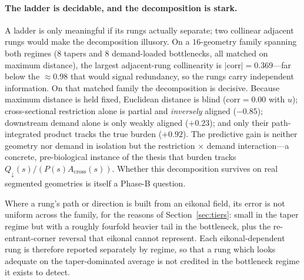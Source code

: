 \documentclass[11pt]{article}
\theoremstyle{remark}
\newcommand{\Acr}{A_{\mathrm{cross}}}
\newcommand{\Qdn}{Q_{\downarrow}}
\begin{document}
\paragraph{The ladder is decidable, and the decomposition is stark.} A ladder is
only meaningful if its rungs actually separate; two collinear adjacent rungs would
make the decomposition illusory. On a $16$-geometry family spanning both regimes
($8$ tapers and $8$ demand-loaded bottlenecks, all matched on maximum distance),
the largest adjacent-rung collinearity is $\lvert\text{corr}\rvert=0.369$---far
below the $\approx0.98$ that would signal redundancy, so the rungs carry
independent information. On that matched family the decomposition is decisive.
Because maximum distance is held fixed, Euclidean distance is blind
($\text{corr}=0.00$ with $u$); cross-sectional restriction alone is partial and
\emph{inversely} aligned ($-0.85$); downstream demand alone is only weakly aligned
($+0.23$); and only their path-integrated product tracks the true burden
($+0.92$). The predictive gain is neither geometry nor demand in isolation but the
restriction$\,\times\,$demand interaction---a concrete, pre-biological instance of
the thesis that burden tracks $\Qdn(s)/(P(s)\Acr(s))$. Whether this decomposition
survives on real segmented geometries is itself a Phase-B question.

Where a rung's path or direction is built from an eikonal field, its error is not
uniform across the family, for the reasons of Section~\ref{sec:tiers}: small in
the taper regime but with a roughly fourfold heavier tail in the bottleneck, plus
the re-entrant-corner reversal that eikonal cannot represent. Each
eikonal-dependent rung is therefore reported separately by regime, so that a rung
which looks adequate on the taper-dominated average is not credited in the
bottleneck regime it exists to detect.
\end{document}
